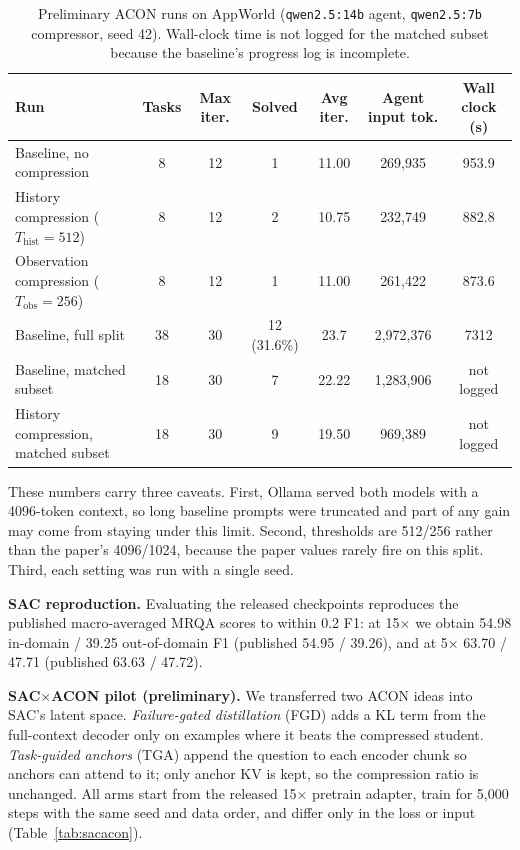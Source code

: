 \documentclass[10pt,a4paper]{article}
\begin{document}
\begin{table}[h]
\centering
\scriptsize
\renewcommand{\arraystretch}{1.12}
\setlength{\tabcolsep}{4pt}
\begin{tabular}{p{}cccccc}
\toprule
\textbf{Run} & \textbf{Tasks} & \textbf{Max iter.} & \textbf{Solved} &
\textbf{Avg iter.} & \textbf{Agent input tok.} & \textbf{Wall clock (s)}\\
\midrule
Baseline, no compression & 8 & 12 & 1 & 11.00 & 269,935 & 953.9\\
History compression ($T_{\mathrm{hist}}=512$) & 8 & 12 & 2 & 10.75 & 232,749 & 882.8\\
Observation compression ($T_{\mathrm{obs}}=256$) & 8 & 12 & 1 & 11.00 & 261,422 & 873.6\\
\midrule
Baseline, full split & 38 & 30 & 12 (31.6\%) & 23.7 & 2,972,376 & 7312\\
\midrule
Baseline, matched subset & 18 & 30 & 7 & 22.22 & 1,283,906 & not logged\\
History compression, matched subset & 18 & 30 & 9 & 19.50 & 969,389 & not logged\\
\bottomrule
\end{tabular}
\caption{Preliminary ACON runs on AppWorld (\texttt{qwen2.5:14b} agent,
\texttt{qwen2.5:7b} compressor, seed 42). Wall-clock time is not logged for
the matched subset because the baseline's progress log is incomplete.}
\label{tab:acon}
\end{table}

These numbers carry three caveats. First, Ollama served both models with a
4096-token context, so long baseline prompts were truncated and part of any
gain may come from staying under this limit. Second, thresholds are 512/256
rather than the paper's 4096/1024, because the paper values rarely fire on
this split. Third, each setting was run with a single seed.

\textbf{SAC reproduction.} Evaluating the released checkpoints reproduces the
published macro-averaged MRQA scores to within 0.2 F1: at 15$\times$ we obtain
54.98 in-domain / 39.25 out-of-domain F1 (published 54.95 / 39.26), and at
5$\times$ 63.70 / 47.71 (published 63.63 / 47.72).

\textbf{SAC$\times$ACON pilot (preliminary).} We transferred two ACON ideas
into SAC's latent space. \emph{Failure-gated distillation} (FGD) adds a KL term
from the full-context decoder only on examples where it beats the compressed
student. \emph{Task-guided anchors} (TGA) append the question to each encoder
chunk so anchors can attend to it; only anchor KV is kept, so the compression
ratio is unchanged. All arms start from the released 15$\times$ pretrain
adapter, train for 5,000 steps with the same seed and data order, and differ
only in the loss or input (Table~\ref{tab:sacacon}).
\end{document}
